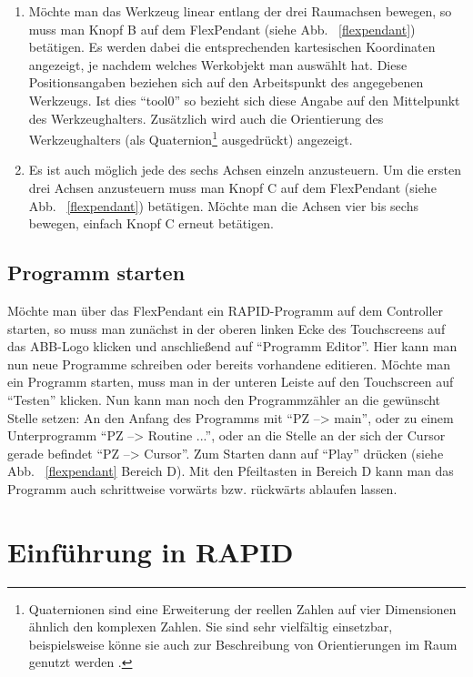 \begin{enumerate}
\item Möchte man das Werkzeug linear entlang der drei Raumachsen bewegen, so muss man Knopf B auf dem FlexPendant (siehe Abb. ~\ref{flexpendant}) betätigen. Es werden dabei die entsprechenden kartesischen Koordinaten angezeigt, je nachdem welches Werkobjekt man auswählt hat. Diese Positionsangaben beziehen sich auf den Arbeitspunkt des angegebenen Werkzeugs. Ist dies \enquote{tool0} so bezieht sich diese Angabe auf den Mittelpunkt des Werkzeughalters. Zusätzlich wird auch die Orientierung des Werkzeughalters (als Quaternion\footnote{Quaternionen sind eine Erweiterung der reellen Zahlen auf vier Dimensionen ähnlich den komplexen Zahlen. Sie  sind  sehr  vielfältig  einsetzbar, beispielsweise könne sie auch zur Beschreibung von Orientierungen im Raum genutzt werden \cite{quaternion}.} ausgedrückt) angezeigt. 

\item Es ist auch möglich jede des sechs Achsen einzeln anzusteuern. Um die ersten drei Achsen anzusteuern muss man Knopf C auf dem FlexPendant (siehe Abb. ~\ref{flexpendant}) betätigen. Möchte man die Achsen vier bis sechs bewegen, einfach Knopf C erneut betätigen. 
\end{enumerate}

\subsection{Programm starten}

Möchte man über das FlexPendant ein RAPID-Programm auf dem Controller starten, so muss man zunächst in der oberen linken Ecke des Touchscreens auf das ABB-Logo klicken und anschließend auf \enquote{Programm Editor}. Hier kann man nun neue Programme schreiben oder bereits vorhandene editieren. Möchte man ein Programm starten, muss man in der unteren Leiste auf den Touchscreen auf \enquote{Testen} klicken. Nun kann man noch den Programmzähler an die gewünscht Stelle setzen: An den Anfang des Programms mit \enquote{PZ --> main}, oder zu einem Unterprogramm \enquote{PZ --> Routine ...}, oder an die Stelle an der sich der Cursor gerade befindet \enquote{PZ --> Cursor}. Zum Starten dann auf \enquote{Play} drücken (siehe Abb. ~\ref{flexpendant} Bereich D). Mit den Pfeiltasten in Bereich D kann man das Programm auch schrittweise vorwärts bzw. rückwärts ablaufen lassen.

\section{Einführung in RAPID}
\label{rapidsection}

